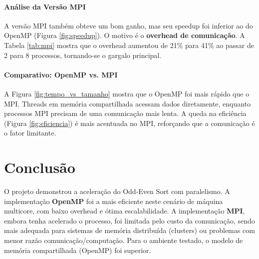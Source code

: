\documentclass[12pt, a4paper]{article}
\begin{document}
\paragraph{Análise da Versão MPI} A versão MPI também obteve um bom ganho, mas seu speedup foi inferior ao do OpenMP (Figura \ref{fig:speedup}). O motivo é o \textbf{overhead de comunicação}. A Tabela \ref{tab:mpi} mostra que o overhead aumentou de 21\% para 41\% ao passar de 2 para 8 processos, tornando-se o gargalo principal.

\paragraph{Comparativo: OpenMP vs. MPI} A Figura \ref{fig:tempo_vs_tamanho} mostra que o OpenMP foi mais rápido que o MPI. Threads em memória compartilhada acessam dados diretamente, enquanto processos MPI precisam de uma comunicação mais lenta. A queda na eficiência (Figura \ref{fig:eficiencia}) é mais acentuada no MPI, reforçando que a comunicação é o fator limitante.

\section{Conclusão}
O projeto demonstrou a aceleração do Odd-Even Sort com paralelismo. A implementação \textbf{OpenMP} foi a mais eficiente neste cenário de máquina multicore, com baixo overhead e ótima escalabilidade. A implementação \textbf{MPI}, embora tenha acelerado o processo, foi limitada pelo custo da comunicação, sendo mais adequada para sistemas de memória distribuída (clusters) ou problemas com menor razão comunicação/computação. Para o ambiente testado, o modelo de memória compartilhada (OpenMP) foi superior.
\end{document}
